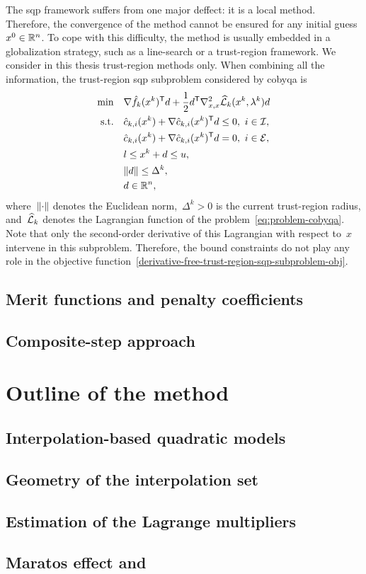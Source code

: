 The \gls{sqp} framework suffers from one major deffect: it is a local method.
Therefore, the convergence of the method cannot be ensured for any initial guess~$x^0 \in \mathbb{R}^n$.
To cope with this difficulty, the method is usually embedded in a globalization strategy, such as a line-search or a trust-region framework.
We consider in this thesis trust-region methods only.
When combining all the information, the trust-region \gls{sqp} subproblem considered by \gls{cobyqa} is
\begin{subequations}
    \begin{align}
        \min        & \quad \nabla \objm[k](x^k)^{\T} d + \frac{1}{2} d^{\T} \nabla_{x, x}^2 \lagm[k](x^k, \lambda^k) d \label{derivative-free-trust-region-sqp-subproblem-obj}\\
        \text{s.t.} & \quad \conm[k]{i}(x^k) + \nabla \conm[k]{i}(x^k)^{\T} d \le 0, ~ i \in \iub,\\
                    & \quad \conm[k]{i}(x^k) + \nabla \conm[k]{i}(x^k)^{\T} d = 0, ~ i \in \ieq,\\
                    & \quad \xl \le x^k + d \le \xu,\\
                    & \quad \norm{d} \le \Delta^k,\\
                    & \quad d \in \R^n,
    \end{align}
\end{subequations}
where~$\lVert\cdot\rVert$ denotes the Euclidean norm,~$\Delta^k > 0$ is the current trust-region radius, and~$\lagm[k]$ denotes the Lagrangian function of the problem~\cref{eq:problem-cobyqa}.
Note that only the second-order derivative of this Lagrangian with respect to~$x$ intervene in this subproblem.
Therefore, the bound constraints do not play any role in the objective function~\cref{derivative-free-trust-region-sqp-subproblem-obj}.

\subsection{Merit functions and penalty coefficients}

\subsection{Composite-step approach}

\section{Outline of the  method}

\subsection{Interpolation-based quadratic models}

\subsection{Geometry of the interpolation set}

\subsection{Estimation of the Lagrange multipliers}

\subsection{Maratos effect and }
